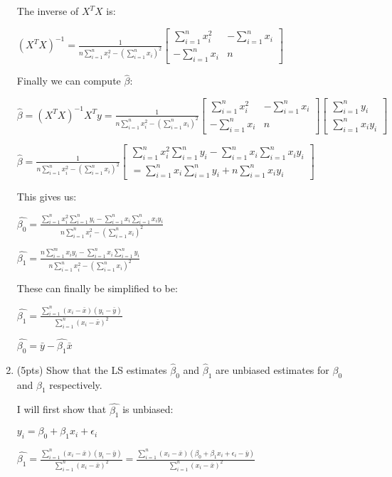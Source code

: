 \documentclass[
]{article}
\begin{document}
\begin{enumerate}
  The inverse of \(X^TX\) is:

  \((X^TX)^{-1} =      \frac{1}{n\sum_{i=1}^nx_i^2-(\sum_{i=1}^nx_i)^2}\begin{bmatrix}
  \sum_{i=1}^nx_i^2 & -\sum_{i=1}^nx_i\\
  -\sum_{i=1}^nx_i & n
  \end{bmatrix}\)

  Finally we can compute \(\hat{\beta}\):

  \(\hat{\beta} = (X^TX)^{-1}X^Ty = \frac{1}{n\sum_{i=1}^nx_i^2-(\sum_{i=1}^nx_i)^2}\begin{bmatrix}
  \sum_{i=1}^nx_i^2 & -\sum_{i=1}^nx_i\\
  -\sum_{i=1}^nx_i & n
  \end{bmatrix}\begin{bmatrix}
  \sum_{i=1}^ny_i\\
  \sum_{i=1}^nx_iy_i
  \end{bmatrix}\)

  \(\hat{\beta} = \frac{1}{n\sum_{i=1}^nx_i^2-(\sum_{i=1}^nx_i)^2}\begin{bmatrix}
  \sum_{i=1}^nx_i^2\sum_{i=1}^ny_i-\sum_{i=1}^nx_i\sum_{i=1}^nx_iy_i\\
  =\sum_{i=1}^nx_i\sum_{i=1}^ny_i+n\sum_{i=1}^nx_iy_i
  \end{bmatrix}\)

  This gives us:

  \(\hat{\beta_0}=\frac{\sum_{i=1}^nx_i^2\sum_{i=1}^ny_i-\sum_{i=1}^nx_i\sum_{i=1}^nx_iy_i}{n\sum_{i=1}^nx_i^2-(\sum_{i=1}^nx_i)^2}\)

  \(\hat{\beta_1}=\frac{n\sum_{i=1}^mx_iy_i-\sum_{i=1}^nx_i\sum_{i=1}^ny_i}{n\sum_{i=1}^nx_i^2-(\sum_{i=1}^nx_i)^2}\)

  These can finally be simplified to be:

  \(\hat{\beta_1} = \frac{\sum_{i=1}^n(x_i-\bar{x})(y_i-\bar{y})}{\sum_{i=1}^n(x_i-\bar{x})^2}\)

  \(\hat{\beta_0} = \bar{y}-\hat{\beta_1}\bar{x}\)
\item
  (5pts) Show that the LS estimates \(\hat\beta_0\) and \(\hat\beta_1\)
  are unbiased estimates for \(\beta_0\) and \(\beta_1\) respectively.

  I will first show that \(\hat{\beta_1}\) is unbiased:

  \(y_i=\beta_0+\beta_1x_i+\epsilon_i\)

  \(\hat{\beta_1} = \frac{\sum_{i=1}^n(x_i-\bar{x})(y_i-\bar{y})}{\sum_{i=1}^n(x_i-\bar{x})^2} = \frac{\sum_{i=1}^n(x_i-\bar{x})(\beta_0+\beta_1x_i+\epsilon_i-\bar{y})}{\sum_{i=1}^n(x_i-\bar{x})^2}\)


\end{enumerate}
\end{document}
